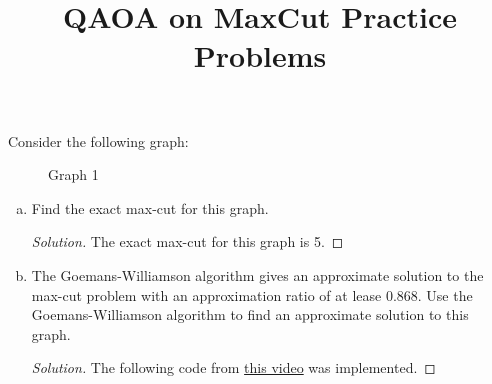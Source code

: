 \documentclass[11pt]{article}
\title{QAOA on MaxCut Practice Problems}
\newenvironment{question}[2][Question]{\begin{trivlist}
\item[\hskip \labelsep {\bfseries #1}\hskip \labelsep {\bfseries #2.}]}{\end{trivlist}}
\newenvironment{solution}{\begin{proof}[Solution]}{\end{proof}}
\begin{document}
    \maketitle


    \begin{question}{1}
        Consider the following graph:
        \begin{figure}[H]
        \begin{center}
        \end{center}
        \caption{Graph 1}
        \end{figure}
        
        \begin{enumerate}[(a)]
            \item 
            Find the exact max-cut for this graph.
            \begin{solution}
                The exact max-cut for this graph is 5.
            \end{solution}
            \item
            The Goemans-Williamson algorithm gives an approximate solution to the max-cut problem with an approximation ratio of at lease 0.868. Use the Goemans-Williamson algorithm to find an approximate solution to this graph.
            \begin{solution}
                The following code from \href{https://www.youtube.com/watch?v=aFVnWq3RHYU}{this video} was implemented. 


\end{solution}
\end{enumerate}
\end{question}
\end{document}

